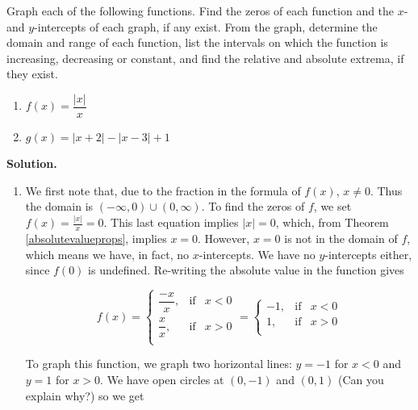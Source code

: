 \begin{ex} Graph each of the following functions.  Find the zeros of each function and the $x$- and $y$-intercepts of  each graph, if any exist.  From the graph, determine the domain and range of each function, list the intervals on which the function is increasing, decreasing or constant, and find the relative and absolute extrema, if they exist.

\begin{multicols}{2}

\begin{enumerate}


\item  $f(x) = \dfrac{|x|}{x}$ 

\item  $g(x) = |x+2| - |x-3|+1$


\end{enumerate}

\end{multicols}

{\bf Solution.}

\begin{enumerate}

\item  We first note that, due to the fraction in the formula of $f(x)$, $x \neq 0$.  Thus the domain is $(-\infty, 0) \cup (0, \infty)$.  To find the zeros of $f$, we set $f(x) = \frac{|x|}{x} = 0$.  This last equation implies $|x|=0$, which, from Theorem \ref{absolutevalueprops}, implies $x=0$.  However, $x=0$ is not in the domain of $f$, which means we have, in fact, no $x$-intercepts.  We have no $y$-intercepts either, since $f(0)$ is undefined.  Re-writing the absolute value in the function gives

\[ f(x) =\left\{ \begin{array}{rcl} \dfrac{-x}{x}, & \mbox{if} & x <0  \\ [10pt] \dfrac{x}{x}, & \mbox{if} & x > 0 \\ \end{array} \right. = \left\{ \begin{array}{rcl} -1, & \mbox{if} & x < 0 \\ 1, & \mbox{if} & x >0 \\ \end{array} \right. \]

To graph this function, we graph two horizontal lines:  $y = -1$ for $x < 0$ and $y = 1$ for $x > 0$.  We have open circles at $(0,-1)$ and $(0,1)$ (Can you explain why?) so we get
\begin{center}


\end{center}
\end{enumerate}
\end{ex}
